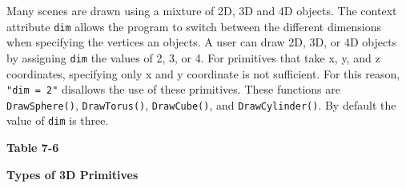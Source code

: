 Many scenes are drawn using a mixture of 2D, 3D and 4D objects. The
context attribute \texttt{dim} allows the program to switch between
the different dimensions when specifying the vertices an objects. A
user can draw 2D, 3D, or 4D objects by assigning \texttt{dim} the
values of 2, 3, or 4. For primitives that take x, y, and z
coordinates, specifying only x and y coordinate is not sufficient. For
this reason, \texttt{"dim = 2"} disallows the use of these
primitives. These functions are \texttt{DrawSphere()},
\texttt{DrawTorus()}, \texttt{DrawCube()}, and
\texttt{DrawCylinder()}. By default the value of \texttt{dim} is
three.

\bigskip

{\centering\sffamily\bfseries
Table 7-6
\par}

{\centering\sffamily\bfseries
Types of 3D Primitives
\par}

